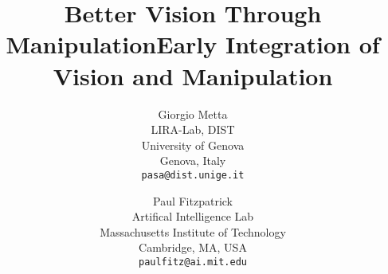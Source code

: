 \documentclass[]{article}
\begin{document}
 



\onecolumn


\ifrev
\title{Better Vision Through Manipulation}
\else
\title{Early Integration of Vision and Manipulation}
\fi

\author{
Giorgio Metta\\
LIRA-Lab, DIST\\
University of Genova\\
Genova, Italy\\
{\tt pasa@dist.unige.it}
\and 
Paul Fitzpatrick\\
Artifical Intelligence Lab\\
Massachusetts Institute of Technology\\
Cambridge, MA, USA\\
{\tt paulfitz@ai.mit.edu}
}





\maketitle

\ifdraft
  \thispagestyle{plain}
  \pagestyle{plain}
\fi


\end{document}
